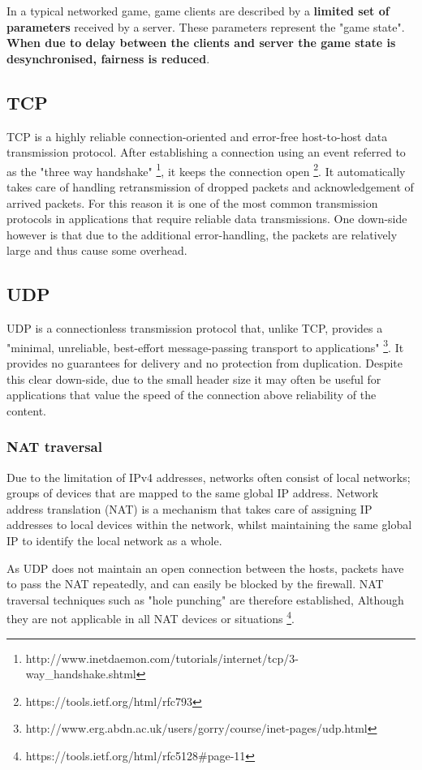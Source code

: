 \documentclass[bsc,frontabs,twoside,singlespacing,parskip,deptreport]{infthesis}     %
\begin{document}
In a typical networked game, game clients are described by a \textbf{limited set of parameters} received by a server. These parameters represent the "game state". \textbf{When due to delay between the clients and server the game state is desynchronised, fairness is reduced}\cite{Fairness_and_Playability}.

\subsection{TCP}
TCP is a highly reliable connection-oriented and error-free host-to-host data transmission protocol. After establishing a connection using an event referred to as the "three way handshake" \footnote{http://www.inetdaemon.com/tutorials/internet/tcp/3-way\_handshake.shtml}, it keeps the connection open \footnote{https://tools.ietf.org/html/rfc793}. It automatically takes care of handling retransmission of dropped packets and acknowledgement of arrived packets. For this reason it is one of the most common transmission protocols in applications that require reliable data transmissions. One down-side however is that due to the additional error-handling, the packets are relatively large and thus cause some overhead.

\subsection{UDP}
UDP is a connectionless transmission protocol that, unlike TCP, provides a "minimal, unreliable, best-effort message-passing transport to applications" \footnote{http://www.erg.abdn.ac.uk/users/gorry/course/inet-pages/udp.html}. It provides no guarantees for delivery and no protection from duplication. Despite this clear down-side, due to the small header size it may often be useful for applications that value the speed of the connection above reliability of the content.
\subsubsection{NAT traversal}
Due to the limitation of IPv4 addresses, networks often consist of local networks; groups of devices that are mapped to the same global IP address. Network address translation (NAT) is a mechanism that takes care of assigning IP addresses to local devices within the network, whilst maintaining the same global IP to identify the local network as a whole.

As UDP does not maintain an open connection between the hosts, packets have to pass the NAT repeatedly, and can easily be blocked by the firewall. 
NAT traversal techniques such as "hole punching" are therefore established, Although they are not applicable in all NAT devices or situations \footnote{https://tools.ietf.org/html/rfc5128\#page-11}.
\end{document}
